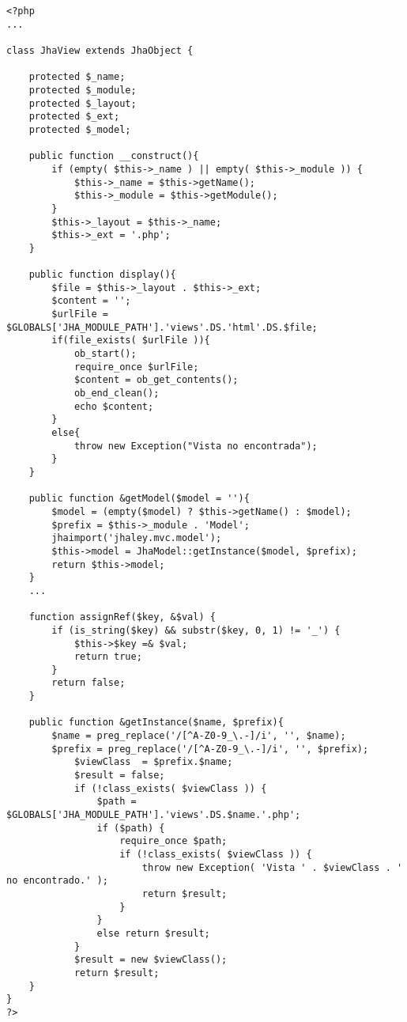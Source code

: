 \begin{lstlisting}[label=jha_view,caption=JhaView.]
<?php
...

class JhaView extends JhaObject {

    protected $_name;
    protected $_module;
    protected $_layout;
    protected $_ext;
    protected $_model;
    
    public function __construct(){
        if (empty( $this->_name ) || empty( $this->_module )) {
            $this->_name = $this->getName();
            $this->_module = $this->getModule();
        }
        $this->_layout = $this->_name;
        $this->_ext = '.php';
    }
    
    public function display(){
    	$file = $this->_layout . $this->_ext;
   	    $content = '';
   	    $urlFile = $GLOBALS['JHA_MODULE_PATH'].'views'.DS.'html'.DS.$file;
   	    if(file_exists( $urlFile )){
   	    	ob_start();
            require_once $urlFile;
            $content = ob_get_contents();
            ob_end_clean();
            echo $content;
        }
        else{
        	throw new Exception("Vista no encontrada");
        }
    }
    
    public function &getModel($model = ''){
    	$model = (empty($model) ? $this->getName() : $model);
        $prefix = $this->_module . 'Model';
        jhaimport('jhaley.mvc.model');
        $this->model = JhaModel::getInstance($model, $prefix);
        return $this->model;
    }
    ...
    
    function assignRef($key, &$val) {
        if (is_string($key) && substr($key, 0, 1) != '_') {
            $this->$key =& $val;
            return true;
        }
        return false;
    }
    
    public function &getInstance($name, $prefix){
        $name = preg_replace('/[^A-Z0-9_\.-]/i', '', $name);
        $prefix = preg_replace('/[^A-Z0-9_\.-]/i', '', $prefix);
		    $viewClass	= $prefix.$name;
		    $result = false;
		    if (!class_exists( $viewClass )) {
			    $path = $GLOBALS['JHA_MODULE_PATH'].'views'.DS.$name.'.php';
			    if ($path) {
				    require_once $path;
				    if (!class_exists( $viewClass )) {
					    throw new Exception( 'Vista ' . $viewClass . ' no encontrado.' );
					    return $result;
				    }
			    }
			    else return $result;
		    }
		    $result = new $viewClass();
		    return $result;
    }
}
?>
\end{lstlisting}
